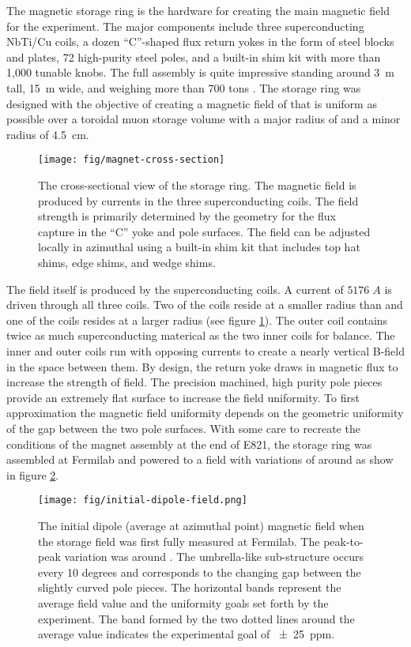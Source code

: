 The magnetic storage ring is the hardware for creating the main magnetic field for the experiment.  The major components include three superconducting NbTi/Cu coils, a dozen ``C''-shaped flux return yokes in the form of steel blocks and plates, 72 high-purity steel poles, and a built-in shim kit with more than 1,000 tunable knobs.  The full assembly is quite impressive standing around \SI{3}{\meter} tall, \SI{15}{\meter} wide, and weighing more than 700 tons \cite{e989-tdr}.  The storage ring was designed with the objective of creating a magnetic field of \bmagic that is uniform as possible over a toroidal muon storage volume with a major radius of \rmagic and a minor radius of \SI{4.5}{\cm}.

\begin{figure}
\label{fig:magnet-cross-section}
\centering
\texttt{[image: fig/magnet-cross-section]}
\caption{The cross-sectional view of the storage ring.  The magnetic field is produced by currents in the three superconducting coils.  The field strength is primarily determined by the geometry for the flux capture in the ``C'' yoke and pole surfaces.  The field can be adjusted locally in azimuthal using a built-in shim kit that includes top hat shims, edge shims, and wedge shims.}
\end{figure}

The field itself is produced by the superconducting coils.  A current of $5176\;A$ is driven through all three coils.  Two of the coils reside at a smaller radius than \rmagic and one of the coils resides at a larger radius (see figure \ref{fig:magnet-cross-section}).  The outer coil contains twice as much superconducting materical as the two inner coils for balance.  The inner and outer coils run with opposing currents to create a nearly vertical B-field in the space between them.  By design, the return yoke draws in magnetic flux to increase the strength of field.  The precision machined, high purity pole pieces provide an extremely flat surface to increase the field uniformity.  To first approximation the magnetic field uniformity depends on the geometric uniformity of the gap between the two pole surfaces.  With some care to recreate the conditions of the magnet assembly at the end of E821, the storage ring was assembled at Fermilab and powered to a field with variations of around  as show in figure \ref{fig:initial-field}.

\begin{figure}
\label{fig:initial-field}
\centering
\texttt{[image: fig/initial-dipole-field.png]}
\caption{The initial dipole (average at azimuthal point) magnetic field when the storage field was first fully measured at Fermilab.  The peak-to-peak variation was around .  The umbrella-like sub-structure occurs every 10 degrees and corresponds to the changing gap between the slightly curved pole pieces.  The horizontal bands represent the average field value and the uniformity goals set forth by the experiment.  The band formed by the two dotted lines around the average value indicates the experimental goal of \SI{\pm 25}{ppm}.}
\end{figure}

